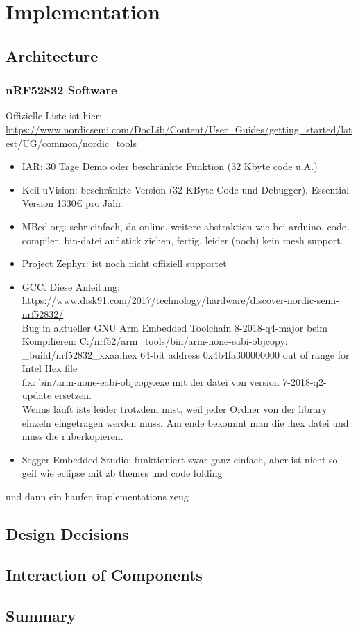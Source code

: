 \chapter{Implementation}
\label{ch:implementation}

\section{Architecture}

\subsection{nRF52832 Software}
Offizielle Liste ist hier:
\url{https://www.nordicsemi.com/DocLib/Content/User_Guides/getting_started/latest/UG/common/nordic_tools}
\begin{itemize}
\item IAR: 30 Tage Demo oder beschränkte Funktion (32 Kbyte code u.A.)
\item Keil uVision: beschränkte Version (32 KByte Code und Debugger). Essential Version 1330€ pro Jahr.
\item MBed.org: sehr einfach, da online. weitere abstraktion wie bei arduino. code, compiler, bin-datei auf stick ziehen, fertig. leider (noch) kein mesh support.
\item Project Zephyr: ist noch nicht offiziell supportet
\item GCC. Diese Anleitung: \url{https://www.disk91.com/2017/technology/hardware/discover-nordic-semi-nrf52832/}\\
Bug in aktueller GNU Arm Embedded Toolchain 8-2018-q4-major beim Kompilieren: C:/nrf52/arm\_tools/bin/arm-none-eabi-objcopy: \_build/nrf52832\_xxaa.hex 64-bit address 0x4b4fa300000000 out of range for Intel Hex file\\
fix: bin/arm-none-eabi-objcopy.exe mit der datei von version 7-2018-q2-update ersetzen.\\
Wenns läuft ists leider trotzdem mist, weil jeder Ordner von der library einzeln eingetragen werden muss. Am ende bekommt man die .hex datei und muss die rüberkopieren.
\item Segger Embedded Studio: funktioniert zwar ganz einfach, aber ist nicht so geil wie eclipse mit zb themes und code folding
\end{itemize}
und dann ein haufen implementations zeug

\section{Design Decisions}

\section{Interaction of Components}

\section{Summary}
